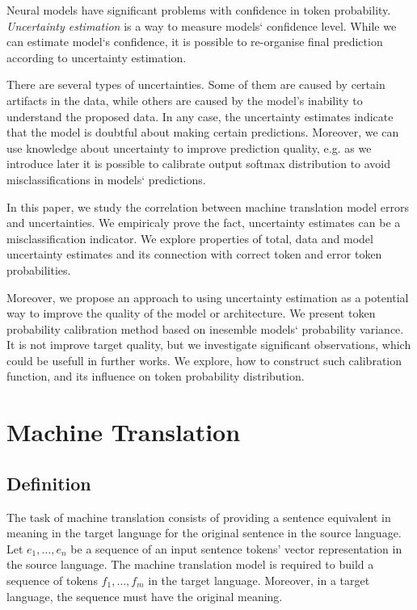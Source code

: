 \documentclass[a4paper,14pt]{extarticle}
\begin{document}
	Neural models have significant problems with confidence in token probability. \textit{Uncertainty estimation} is a way to measure models` confidence level. While we can estimate model`s confidence, it is possible to re-organise final prediction according to uncertainty estimation.
	
	There are several types of uncertainties. Some of them are caused by certain artifacts in the data, while others are caused by the model's inability to understand the proposed data. In any case, the uncertainty estimates indicate that the model is doubtful about making certain predictions.	Moreover, we can use knowledge about uncertainty to improve prediction quality, e.g. as we introduce later it is possible to calibrate output softmax distribution to avoid misclassifications in models` predictions.
	
	In this paper, we study the correlation between machine translation model errors and uncertainties. We empiricaly prove the fact, uncertainty estimates can be a misclassification indicator. We explore properties of total, data and model uncertainty estimates and its connection with correct token and error token probabilities.
	
	Moreover, we propose an approach to using uncertainty estimation as a potential way to improve the quality of the model or architecture. We present token probability calibration method based on inesemble models` probability variance. It is not improve target quality, but we investigate significant observations, which could be usefull in further works. We explore, how to construct such calibration function, and its influence on token probability distribution. 
	\section{Machine Translation}
	\subsection{Definition}
		The task of machine translation consists of providing a sentence equivalent in meaning in the target language for the original sentence in the source language. Let $e_1, \dots, e_n$ be a sequence of an input sentence tokens' vector representation in the source language. The machine translation model is required to build a sequence of tokens $f_1, \dots, f_m$ in the target language. Moreover, in a target language, the sequence must have the original meaning.
	
\end{document}
